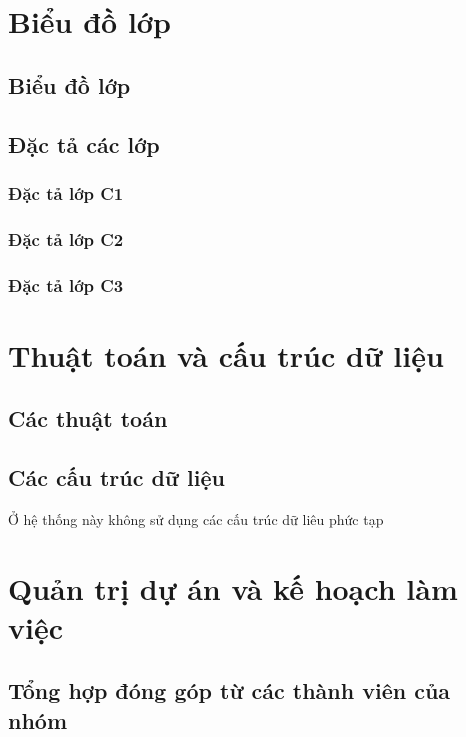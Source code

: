 \documentclass[a4paper, 12pt]{article}
\begin{document}
	\clearpage

\section{Biểu đồ lớp}

\subsection{Biểu đồ lớp}

\subsection{Đặc tả các lớp}

\subsubsection{Đặc tả lớp C1}

\subsubsection{Đặc tả lớp C2}

\subsubsection{Đặc tả lớp C3}

\clearpage

\section{Thuật toán và cấu trúc dữ liệu}

\subsection{Các thuật toán}

\subsection{Các cấu trúc dữ liệu}
	Ở hệ thống này không sử dụng các cấu trúc dữ liêu phức tạp


\clearpage

\section{Quản trị dự án và kế hoạch làm việc}

\subsection{Tổng hợp đóng góp từ các thành viên của nhóm}
\end{document}
